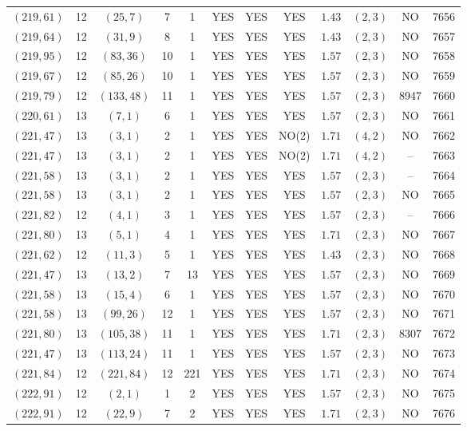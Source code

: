 \begin{longtable}{|c|c|c|c|c|c|c|c|c|c|c|c|}
$(219,61)$ & 12 & $(25,7)$ & 7 & 1 & YES & YES & YES & $1.43$ & $(2,3)$ & NO & 7656\\
$(219,64)$ & 12 & $(31,9)$ & 8 & 1 & YES & YES & YES & $1.43$ & $(2,3)$ & NO & 7657\\
$(219,95)$ & 12 & $(83,36)$ & 10 & 1 & YES & YES & YES & $1.57$ & $(2,3)$ & NO & 7658\\
$(219,67)$ & 12 & $(85,26)$ & 10 & 1 & YES & YES & YES & $1.57$ & $(2,3)$ & NO & 7659\\
$(219,79)$ & 12 & $(133,48)$ & 11 & 1 & YES & YES & YES & $1.57$ & $(2,3)$ & 8947 & 7660\\
$(220,61)$ & 13 & $(7,1)$ & 6 & 1 & YES & YES & YES & $1.57$ & $(2,3)$ & NO & 7661\\
$(221,47)$ & 13 & $(3,1)$ & 2 & 1 & YES & YES & NO(2) & $1.71$ & $(4,2)$ & NO & 7662\\
$(221,47)$ & 13 & $(3,1)$ & 2 & 1 & YES & YES & NO(2) & $1.71$ & $(4,2)$ & -- & 7663\\
$(221,58)$ & 13 & $(3,1)$ & 2 & 1 & YES & YES & YES & $1.57$ & $(2,3)$ & -- & 7664\\
$(221,58)$ & 13 & $(3,1)$ & 2 & 1 & YES & YES & YES & $1.57$ & $(2,3)$ & NO & 7665\\
$(221,82)$ & 12 & $(4,1)$ & 3 & 1 & YES & YES & YES & $1.57$ & $(2,3)$ & -- & 7666\\
$(221,80)$ & 13 & $(5,1)$ & 4 & 1 & YES & YES & YES & $1.71$ & $(2,3)$ & NO & 7667\\
$(221,62)$ & 12 & $(11,3)$ & 5 & 1 & YES & YES & YES & $1.43$ & $(2,3)$ & NO & 7668\\
$(221,47)$ & 13 & $(13,2)$ & 7 & 13 & YES & YES & YES & $1.57$ & $(2,3)$ & NO & 7669\\
$(221,58)$ & 13 & $(15,4)$ & 6 & 1 & YES & YES & YES & $1.57$ & $(2,3)$ & NO & 7670\\
$(221,58)$ & 13 & $(99,26)$ & 12 & 1 & YES & YES & YES & $1.57$ & $(2,3)$ & NO & 7671\\
$(221,80)$ & 13 & $(105,38)$ & 11 & 1 & YES & YES & YES & $1.71$ & $(2,3)$ & 8307 & 7672\\
$(221,47)$ & 13 & $(113,24)$ & 11 & 1 & YES & YES & YES & $1.57$ & $(2,3)$ & NO & 7673\\
$(221,84)$ & 12 & $(221,84)$ & 12 & 221 & YES & YES & YES & $1.71$ & $(2,3)$ & NO & 7674\\
$(222,91)$ & 12 & $(2,1)$ & 1 & 2 & YES & YES & YES & $1.57$ & $(2,3)$ & NO & 7675\\
$(222,91)$ & 12 & $(22,9)$ & 7 & 2 & YES & YES & YES & $1.71$ & $(2,3)$ & NO & 7676\\

\end{longtable}
